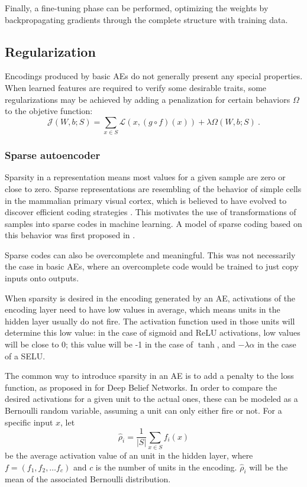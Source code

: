 Finally, a fine-tuning phase can be performed, optimizing the weights by backpropagating gradients through the complete structure with training data.



\subsection{Regularization}\label{p1Sec.Regularization}

Encodings produced by basic AEs do not generally present any special properties. When learned features are required to verify some desirable traits, some regularizations may be achieved by adding a penalization for certain behaviors $\Omega$ to the objetive function: 
\begin{equation}
  \mathcal J(W,b;S)=\sum_{x\in S} \mathcal L(x, (g\circ f)(x)) + \lambda\Omega(W,b;S)~.
\end{equation}

\subsubsection{Sparse autoencoder}\label{p1Sec.SparseAE}

Sparsity in a representation means most values for a given sample are zero or close to zero. Sparse representations are resembling of the behavior of simple cells in the mammalian primary visual cortex, which is believed to have evolved to discover efficient coding strategies . This motivates the use of transformations of samples into sparse codes in machine learning. A model of sparse coding based on this behavior was first proposed in .

Sparse codes can also be overcomplete and meaningful. This was not necessarily the case in basic AEs, where an overcomplete code would be trained to just copy inputs onto outputs.

When sparsity is desired in the encoding generated by an AE, activations of the encoding layer need to have low values in average, which means units in the hidden layer usually do not fire. The activation function used in those units will determine this low value: in the case of sigmoid and ReLU activations, low values will be close to 0; this value will be -1 in the case of $\tanh$, and $-\lambda\alpha$ in the case of a SELU. 

The common way to introduce sparsity in an AE is to add a penalty to the loss function, as proposed in  for Deep Belief Networks. In order to compare the desired activations for a given unit to the actual ones, these can be modeled as a Bernoulli random variable, assuming a unit can only either fire or not. For a specific input $x$, let
\begin{equation}
  \hat\rho_i=\frac{1}{\left\lvert S\right\rvert} \sum_{x\in S} f_i(x)
\end{equation}
be the average activation value of an unit in the hidden layer, where $f=(f_1,f_2,\dots f_c)$ and $c$ is the number of units in the encoding. $\hat\rho_i$ will be the mean of the associated Bernoulli distribution.

